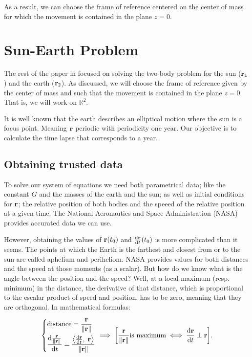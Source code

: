 \documentclass[12pt, onside]{article}
\newcommand{\R}{{\mathbb{R}}}
\newcommand{\inner}[2]{\left\langle #1, \; #2 \right\rangle}
\newcommand{\vr}{{\vb{r}}}
\begin{document}
    As a result, we can choose the frame of reference centered on the center of mass for which
the movement is contained in the plane $z = 0$.

\section{Sun-Earth Problem}

    The rest of the paper in focused on solving the two-body problem
for the sun ($\vr_1$) and the earth ($\vr_2$).
As discussed, we will choose the frame of reference given by the center of mass
and such that the movement is contained in the plane $z = 0$.
That is, we will work on $\R^2$.

    It is well known that the earth describes an elliptical motion
where the sun is a focus point.
Meaning $\vr$ periodic with periodicity one year.
Our objective is to calculate the time lapse that corresponds to a year.

\subsection{Obtaining trusted data}

    To solve our system of equations we need both parametrical data;
like the constant $G$ and the masses of the earth and the sun;
as well as initial conditions for $\vr$;
the relative position of both bodies and
the speeed of the relative position at a given time.
The National Aeronautics and Space Administration (NASA)
provides accurated data we can use\footnotemark.


    However, obtaining the values of $\vr(t_0)$ and $\dv{\vr}{t}{(t_0)}$
is more complicated than it seems.
The points at which the Earth is the farthest and closest from or to the sun
are called aphelium and periheliom.
NASA provides values for both distances and the speed at those moments (as a scalar).
But how do we know what is the angle between the position and the speed?
Well, at a local maximum (resp. minimum) in the distance,
the derivative of that distance,
which is proportional to the escalar product of speed and position,
has to be zero,
meaning that they are orthogonal.
In mathematical formulas:

\begin{equation*}
    \begin{dcases}
        \operatorname{distance} = \frac{\vr}{\norm{\vr}} \\
        \dv{\frac{\vr}{\norm{\vr}}}{t} = \frac{\inner{\dv{\vr}{t}}{\vr}}{\norm{\vr}}
    \end{dcases}
    \implies
    \qty[ \frac{\vr}{\norm{\vr}} \text{is maximum} \iff \dv{\vr}{t} \perp \vr ].
\end{equation*}
\end{document}
